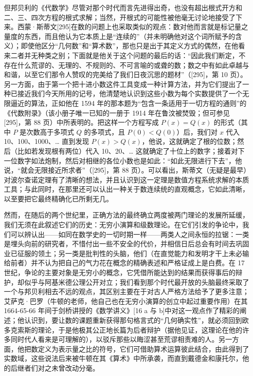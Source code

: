 但邦贝利的《代数学》尽管对那个时代而言先进得出奇，也没有超出根式开方和二、三、四次方程的根式求解；当然，开根式的可能性被他毫无讨论地接受了下来。西蒙·斯蒂文{[}295{]}在数的问题上也采取类似的观点：数对他而言就是标记量之量度的东西，而且他认为它本质上是“连续的”（并未明确他对这个词所赋予的含义）；即使他区分“几何数”和“算术数”，那也只是出于其定义方式的偶然，在他看来二者并无种类之别；下面就是他关于这个问题的最后的话：“因此我们断定，不存在什么荒谬的、无理的、不规则的、不可言喻的或聋的数；数之中有如此卓越与和谐，以至它们那令人赞叹的完美给了我们日夜沉思的题材”（{[}295{]}，第 10 页）。另一方面，由于第一个把十进小数这件工具变成一种计算方法，并为它们提出了一种已接近我们今天所用的记号，他清楚地认识到这些小数为每个实数提供了一个无限逼近的算法，正如他在 1594 年的那本题为“包含一条适用于一切方程的通则”的《代数附录》（该小册子唯一已知的一册于 1914 年在鲁汶被焚毁；但可参见{[}295{]}，第 88 页）中所表明的。把这样一个方程写成 \(P(x) = Q(x)\) 的形式（其中 \(P\) 是次数高于多项式 \(Q\) 的多项式，且 \(P(0) < Q(0)\)）后，我们对 \(x\) 代入 10、100、1000、\ldots{} 直到发现 \(P(x) > Q(x)\)，他说，这就确定了根的位数；然后（比如若发现根有两位）代入 10、20、\ldots{} 这就确定了十位上的数字；接着对下一位数字如法炮制，然后对相继的各位小数也是如此：“如此无限进行下去”，他说，“就会无限接近所求者”（{[}295{]}，第 88 页）。可以看出，斯蒂文（无疑是最早）对波尔查诺定理有了清晰的想法，并且认识到这一定理是数值方程系统求解的本质工具；与此同时，在那里还可以认出一种关于数连续统的直观概念，它如此清晰，以至要把它最终精确化已所剩无几。

然而，在随后的两个世纪里，正确方法的最终确立两度被两门理论的发展所延缓，我们无须在此叙述它们的历史：无穷小演算和级数理论。在它们引发的争论中，我们可以辨认出——如同在数学史的一切时期一样——两类人之间永恒的拉锯：一类是埋头向前的研究者，不惜付出一些不安全的代价，并相信日后总会有时间去巩固业已征服的领土；另一类是批判性的头脑，他们（在直觉能力和发明才干上未必输给前者）并不认为把自己的气力花在概念的精确表述和严格证成上是白费。在 17 世纪，争论的主要对象是无穷小的概念，它凭借所能达到的结果而获得事后的辩护，却似乎与阿基米德公理公开对立；我们看到那个时代最开放的头脑最终采取了一个与邦贝利相去不远的观点，其区别主要在于对古人严格方法给予了更多注意；艾萨克·巴罗（牛顿的老师，他自己也在无穷小演算的创立中起过重要作用）在其 1664-65-66 年间于剑桥讲授的《数学讲义》{[}16 a 与 b{]}中对这一观点作了精彩的阐述；他认识到，要让数的课题重新获得那句格言式的“几何确实性”，就必须回到欧多克索斯的理论，于是他极其公正地长篇为后者辩护（据他见证，这理论在他的许多同时代人看来是可理解的），以驳斥那些以晦涩甚至荒谬相责难的人。另一方面，他把数定义为表示量之比的符号，它们可借助算术运算彼此结合，由此得到了实数域，这些说法后来被牛顿在其《算术》中所承袭，而直到戴德金和康托尔，他的后继者们对之未曾改动分毫。

